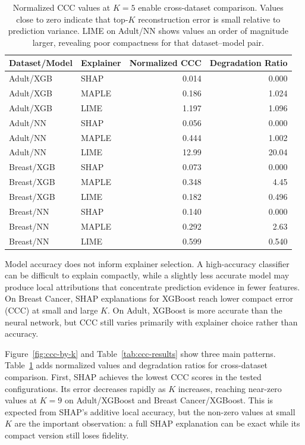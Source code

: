 \documentclass[sigconf,nonacm]{acmart}
\begin{document}
\begin{table}[t]
  \centering
  \caption{Normalized CCC values at $K=5$ enable cross-dataset comparison. Values
  close to zero indicate that top-$K$ reconstruction error is small relative to
  prediction variance. LIME on Adult/NN shows values an order of magnitude larger,
  revealing poor compactness for that dataset--model pair.}
  \label{tab:ccc-normalized}
  \begin{tabular}{llrr}
    \toprule
    Dataset/Model & Explainer & Normalized CCC & Degradation Ratio \\
    \midrule
    Adult/XGB & SHAP   & 0.014 & 0.000 \\
    Adult/XGB & MAPLE  & 0.186 & 1.024 \\
    Adult/XGB & LIME   & 1.197 & 1.096 \\
    Adult/NN  & SHAP   & 0.056 & 0.000 \\
    Adult/NN  & MAPLE  & 0.444 & 1.002 \\
    Adult/NN  & LIME   & 12.99 & 20.04 \\
    Breast/XGB & SHAP  & 0.073 & 0.000 \\
    Breast/XGB & MAPLE & 0.348 & 4.45 \\
    Breast/XGB & LIME  & 0.182 & 0.496 \\
    Breast/NN  & SHAP  & 0.140 & 0.000 \\
    Breast/NN  & MAPLE & 0.292 & 2.63 \\
    Breast/NN  & LIME  & 0.599 & 0.540 \\
    \bottomrule
  \end{tabular}
\end{table}

Model accuracy does not inform explainer selection. A high-accuracy classifier
can be difficult to explain compactly, while a slightly less accurate model may
produce local attributions that concentrate prediction evidence in fewer features.
On Breast Cancer, SHAP explanations for XGBoost reach lower compact error
(CCC) at small and large $K$. On Adult, XGBoost is more accurate than the neural
network, but CCC still varies primarily with explainer choice rather than accuracy.

Figure~\ref{fig:ccc-by-k} and Table~\ref{tab:ccc-results} show three main
patterns. Table~\ref{tab:ccc-normalized} adds normalized values and degradation ratios
for cross-dataset comparison. First, SHAP achieves the lowest CCC scores in the tested configurations. Its error decreases
rapidly as $K$ increases, reaching near-zero values at $K=9$ on Adult/XGBoost
and Breast Cancer/XGBoost. This is expected from SHAP's additive local accuracy,
but the non-zero values at small $K$ are the important observation: a full SHAP
explanation can be exact while its compact version still loses fidelity.
\end{document}
